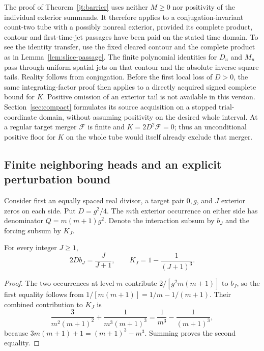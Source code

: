 \begin{remark}
\label{jt:local-version}
The proof of Theorem~\ref{jt:barrier} uses neither $M\ge0$ nor positivity
of the individual exterior summands. It therefore applies to a
conjugation-invariant count-two tube with a possibly nonreal exterior,
provided its complete product, contour and first-time-jet passages have
been paid on the stated time domain. To see the identity transfer,
use the fixed cleared contour and the complete product as in
Lemma~\ref{lem:slice-passage}. The finite polynomial identities for $D_u$
and $M_u$ pass through uniform spatial jets on that contour and the
absolute inverse-square tails. Reality follows from conjugation.
Before the first local loss of $D>0$, the same integrating-factor proof
then applies to a directly acquired signed complete bound for $K$.
Positive omission of an exterior tail is not available in this version.
Section~\ref{sec:compact} formulates its source acquisition on a stopped
trial-coordinate domain, without assuming positivity on the desired
whole interval. At a regular target merger $\mathcal F$ is finite and
$K=2D^2\mathcal F=0$; thus an unconditional positive floor for $K$ on
the whole tube would itself already exclude that merger.
\end{remark}

\subsection{Finite neighboring heads and an explicit perturbation bound}

Consider first an equally spaced real divisor, a target pair $0,g$, and
$J$ exterior zeros on each side. Put $D=g^2/4$. The $m$th exterior
occurrence on either side has denominator $Q=m(m+1)g^2$. Denote the
interaction subsum by $b_J$ and the forcing subsum by $K_J$.

\begin{lemma}
\label{jt:lattice}
For every integer $J\ge1$,
\begin{equation}
 2Db_J=\frac{J}{J+1},\qquad K_J=1-\frac1{(J+1)^3}.
 \label{jt:lattice-values}
\end{equation}
\end{lemma}

\begin{proof}
The two occurrences at level $m$ contribute
$2/[g^2m(m+1)]$ to $b_J$, so the first equality follows from
$1/[m(m+1)]=1/m-1/(m+1)$. Their combined contribution to $K_J$ is
\[
 \frac3{m^2(m+1)^2}+\frac1{m^3(m+1)^3}
 =\frac1{m^3}-\frac1{(m+1)^3},
\]
because $3m(m+1)+1=(m+1)^3-m^3$. Summing proves the second equality.
\end{proof}

